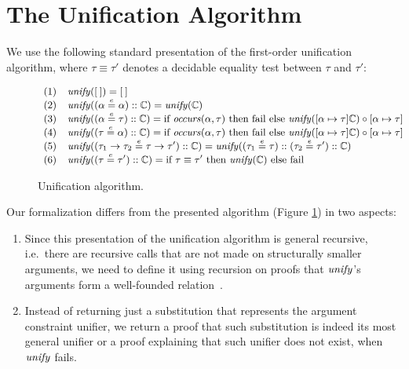 \section{The Unification Algorithm}\label{algorithm-section}

We use the following standard presentation of the first-order
unification algorithm, where $\tau\equiv\tau'$ denotes a decidable
equality test between $\tau$ and $\tau'$:

\begin{figure}
\[
\small{
\begin{array}{ll}
(1) & \unify([\: ]) = [\: ]\\
(2) & \unify((\alpha \eeq \alpha) :: \mathbb{C}) = \unify(\mathbb{C})\\
(3) & \unify((\alpha \eeq\tau) :: \mathbb{C}) = 
      \If \occurs(\alpha,\tau) \Then \fail \Else \unify([\alpha\mapsto\tau]\mathbb{C})\circ [\alpha \mapsto \tau]\\
(4) & \unify((\tau \eeq\alpha) :: \mathbb{C}) = 
      \If \occurs(\alpha,\tau) \Then \fail \Else \unify([\alpha\mapsto\tau]\mathbb{C})\circ [\alpha \mapsto \tau]\\
(5) & \unify((\tau_1\to\tau_2 \eeq \tau\to\tau')::\mathbb{C}) = 
      \unify((\tau_1\eeq\tau)::(\tau_2\eeq\tau')::\mathbb{C}) \\
(6) & \unify((\tau \eeq \tau')::\mathbb{C}) = \If \tau\equiv\tau' \Then \unify(\mathbb{C}) \Else \fail 
\end{array}}
\]
\caption{Unification algorithm.}
\label{unifyalgorithm}
\end{figure}

Our formalization differs from the presented algorithm (Figure
\ref{unifyalgorithm}) in two aspects:
\begin{enumerate}
     \item Since this presentation of the unification algorithm is
       general recursive, i.e.~there are recursive calls that are not
       made on structurally smaller arguments, we need to define it
       using recursion on proofs that $\text{\it unify\/}$'s arguments form a
       well-founded relation~.
    \item Instead of returning just a substitution that represents the
      argument constraint unifier, we return a proof that such
      substitution is indeed its most general unifier or a proof
      explaining that such unifier does not exist, when $\text{\it unify\/}$
      fails.
\end{enumerate}

